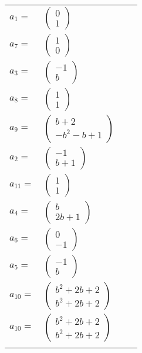 \documentclass[1p]{elsarticle_modified}
\theoremstyle{definition}
\begin{document}
\begin{tabular}{m{7pt} m{180pt} m{7pt} m{180pt} }
\flushright $a_{1}=$&$\begin{pmatrix}0\\1\end{pmatrix}$ \\
\flushright $a_{7}=$&$\begin{pmatrix}1\\0\end{pmatrix}$ \\
\flushright $a_{3}=$&$\begin{pmatrix}-1\\b\end{pmatrix}$ \\
\flushright $a_{8}=$&$\begin{pmatrix}1\\1\end{pmatrix}$ \\
\flushright $a_{9}=$&$\begin{pmatrix}b+2\\- b^2- b+1\end{pmatrix}$ \\
\flushright $a_{2}=$&$\begin{pmatrix}-1\\b+1\end{pmatrix}$ \\
\flushright $a_{11}=$&$\begin{pmatrix}1\\1\end{pmatrix}$ \\
\flushright $a_{4}=$&$\begin{pmatrix}b\\2 b+1\end{pmatrix}$ \\
\flushright $a_{6}=$&$\begin{pmatrix}0\\-1\end{pmatrix}$ \\
\flushright $a_{5}=$&$\begin{pmatrix}-1\\b\end{pmatrix}$ \\
\flushright $a_{10}=$&$\begin{pmatrix}b^2+2 b+2\\b^2+2 b+2\end{pmatrix}$\\ \flushright $a_{10}=$&$\begin{pmatrix}b^2+2 b+2\\b^2+2 b+2\end{pmatrix}$\\&\end{tabular}
\end{document}
